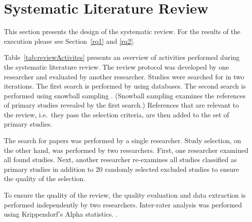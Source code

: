 
\section{\label{slr}Systematic Literature Review}

This section presents the design of the systematic review. For the results of the execution please see Section~\ref{rq1} and \ref{rq2}.

Table~\ref{tab:reviewActivites} presents an overview of activities performed during the systematic literature review. The review protocol was developed by one researcher and evaluated by another researcher. Studies were searched for in two iterations. The first search is performed by using databases. The second search is performed using snowball sampling \citep{Goodman1961}. (Snowball sampling examines the references of primary studies revealed by the first search.) References that are relevant to the review, i.e.\ they pass the selection criteria, are then added to the set of primary studies.

The search for papers was performed by a single researcher. Study selection, on the other hand, was performed by two researchers. First, one researcher examined all found studies. Next, another researcher re-examines all studies classified as primary studies in addition to 20 randomly selected excluded studies to ensure the quality of the selection.

To ensure the quality of the review, the quality evaluation and data extraction is performed independently by two researchers. Inter-rater analysis was performed using Krippendorf's Alpha statistics. \citep{Krippendorff1970,Krippendorff2004a}.

